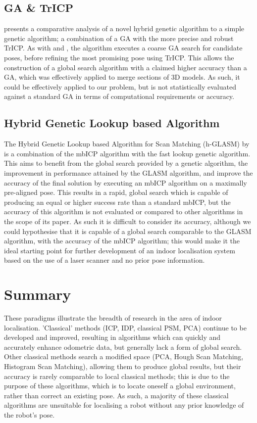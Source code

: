 \documentclass[authoryearcitations]{UoYCSproject}
\begin{document}
\subsection{GA \& TrICP}
\citet{Lomonosov2006-vq} presents a comparative analysis of a novel hybrid genetic algorithm to a simple genetic algorithm; a combination of a GA with the more precise and robust TrICP. As with \cite{Brunnstrom1996-vo} and \cite{Martinez2006-ci}, the algorithm executes a coarse GA search for candidate poses, before refining the most promising pose using TrICP. This allows the construction of a global search algorithm with a claimed higher accuracy than a GA, which was effectively applied to merge sections of 3D models. As such, it could be effectively applied to our problem, but is not statistically evaluated against a standard GA in terms of computational requirements or accuracy. 

\subsection{Hybrid Genetic Lookup based Algorithm}
\label{subsec:hglasm}
The Hybrid Genetic Lookup based Algorithm for Scan Matching (h-GLASM) by \citet{Lenac2011-co} is a combination of the mbICP algorithm with the fast lookup genetic algorithm. This aims to benefit from the global search provided by a genetic algorithm, the improvement in performance attained by the GLASM algorithm, and improve the accuracy of the final solution by executing an mbICP algorithm on a maximally pre-aligned pose. This results in a rapid, global search which is capable of producing an equal or higher success rate than a standard mbICP, but the accuracy of this algorithm is not evaluated or compared to other algorithms in the scope of its paper. As such it is difficult to consider its accuracy, although we could hypothesise that it is capable of a global search comparable to the GLASM algorithm, with the accuracy of the mbICP algorithm; this would make it the ideal starting point for further development of an indoor localisation system based on the use of a laser scanner and no prior pose information.



\section{Summary}
These paradigms illustrate the breadth of research in the area of indoor localisation. 'Classical' methods (ICP, IDP, classical PSM, PCA) continue to be developed and improved, resulting in algorithms which can quickly and accurately enhance odometric data, but generally lack a form of global search. Other classical methods search a modified space (PCA, Hough Scan Matching, Histogram Scan Matching), allowing them to produce global results, but their accuracy is rarely comparable to local classical methods; this is due to the purpose of these algorithms, which is to locate oneself a global environment, rather than correct an existing pose. As such, a majority of these classical algorithms are unsuitable for localising a robot without any prior knowledge of the robot's pose. \newline
\end{document}
